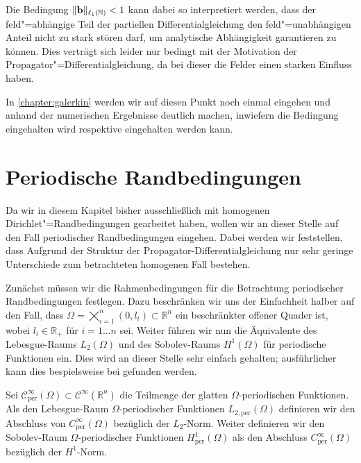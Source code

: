 Die Bedingung $\lVert\mathbf{b}\rVert_{\ell_{1}(\mathbb{N})} < 1$ kann dabei so interpretiert werden, dass der feld"=abhängige Teil der partiellen Differentialgleichung den feld"=unabhängigen Anteil nicht zu stark stören darf, um analytische Abhängigkeit garantieren zu können.
Dies verträgt sich leider nur bedingt mit der Motivation der Propagator"=Differentialgleichung, da bei dieser die Felder einen starken Einfluss haben.

In \cref{chapter:galerkin} werden wir auf diesen Punkt noch einmal eingehen und anhand der numerischen Ergebnisse deutlich machen, inwiefern die Bedingung eingehalten wird respektive eingehalten werden kann.

\section{Periodische Randbedingungen} %
\label{section:periodische_randbedingungen}

Da wir in diesem Kapitel bisher ausschließlich mit homogenen Dirichlet"=Randbedingungen gearbeitet haben, wollen wir an dieser Stelle auf den Fall periodischer Randbedingungen eingehen.
Dabei werden wir feststellen, dass Aufgrund der Struktur der Propagator-Differentialgleichung nur sehr geringe Unterschiede zum betrachteten homogenen Fall bestehen.

Zunächst müssen wir die Rahmenbedingungen für die Betrachtung periodischer Randbedingungen festlegen.
Dazu beschränken wir uns der Einfachheit halber auf den Fall, dass $\Omega = \bigtimes_{i = 1}^{n} (0, l_{i}) \subset \mathbb{R}^{n}$ ein beschränkter offener Quader ist, wobei $l_{i} \in \mathbb{R}_{+}$ für $i = 1 \dots n$ sei.
Weiter führen wir nun die Äquivalente des Lebesgue-Raums $L_{2}(\Omega)$ und des Sobolev-Raums $H^{1}(\Omega)$ für periodische Funktionen ein.
Dies wird an dieser Stelle sehr einfach gehalten; ausführlicher kann dies bespielsweise bei \textcite{Han2009} gefunden werden.

\begin{Definition}
\label{definition:periodische_sobolev_raeume}
    Sei $\mathcal C_{\text{per}}^{\infty}(\Omega) \subset \mathcal C^{\infty}(\mathbb{R}^{n})$ die Teilmenge der glatten $\Omega$-periodischen Funktionen.
    Als den Lebesgue-Raum $\Omega$-periodischer Funktionen $L_{2,\text{per}}(\Omega)$  definieren wir den Abschluss von $C_{\text{per}}^{\infty}(\Omega)$ bezüglich der $L_{2}$-Norm.
    Weiter definieren wir den Sobolev-Raum $\Omega$-periodischer Funktionen $H^{1}_{\text{per}}(\Omega)$ als den Abschluss $C_{\text{per}}^{\infty}(\Omega)$ bezüglich der $H^{1}$-Norm.
\end{Definition}

